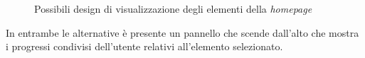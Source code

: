 \begin{figure} [h]
    \centering
    \caption{Possibili design di visualizzazione degli elementi della \textit{homepage}}
    \label{fig:homepages}
\end{figure}

In entrambe le alternative è presente un pannello che scende dall'alto che mostra i progressi condivisi dell'utente relativi all'elemento selezionato.

